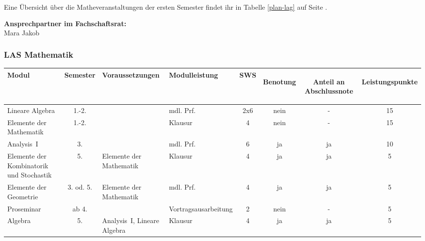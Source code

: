 Eine Übersicht über die Matheveranstaltungen der ersten Semester findet ihr in Tabelle \ref{plan-lag} auf Seite \pageref{plan-lag}.

\textbf{Ansprechpartner im Fachschaftsrat:}\\
Mara Jakob\\



\subsubsection{LAS Mathematik}
\label{studiengang_las}

\begin{table}[tbp]
    \begin{footnotesize}
    \begin{tabularx}{\textwidth}{|@{~}X@{~}|@{~}c@{~}|@{~}X@{~}|@{~}X@{~}|@{~}c@{~}|@{~}c@{~}|@{~}c@{~}|@{~}c@{~}|}
        \hline
        Modul & Semes\-ter & Voraus\-setzungen & Modul\-leistung & SWS & \begin{sideways}Be\-notung\end{sideways} & \begin{sideways}Anteil an Abschluss\-note \end{sideways}& \begin{sideways}Leistungspunkte\end{sideways}\\\hline\hline

        Lineare Algebra &1.-2.&&mdl. Prf.&2x6&nein&-&15\\\hline
        Elemente der Mathematik &1.-2.&&Klausur&4&nein&-&15\\\hline
        Analysis~I &3.&&mdl. Prf.&6&ja&ja&10\\\hline
        Elemente der Kombinatorik und Stochastik &5.&Elemente der Mathematik&Klausur&4&ja&ja&5\\\hline
        Elemente der Geometrie &3. od. 5.&Elemente der Mathematik&mdl. Prf.&4&ja&ja&5\\\hline
        Proseminar & ab 4. & & Vortrags\-ausarbeitung &2&nein&-&5\\\hline
        Algebra & 5. &Analysis~I, Lineare Algebra & Klausur & 4 & ja & ja & 5\\\hline\hline


\end{tabularx}
\end{footnotesize}
\end{table}

